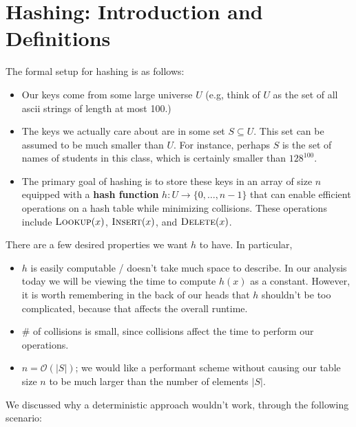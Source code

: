 \documentclass[14pt]{extreport}
\begin{document}
\section*{Hashing: Introduction and Definitions}
    The formal setup for hashing is as follows:
    \begin{itemize}[label={\textbf{--}}]
        \item Our keys come from some large universe $U$ (e.g, think of $U$ as the set of all ascii strings of length at most 100.) 
        \item The keys we actually care about are in some set $S \subseteq U$. This set can be assumed to be much smaller than $U$. For instance, perhaps $S$ is the set of names of students in this class, which is certainly smaller than $128^{100}$.
        \item The primary goal of hashing is to store these keys in an array of size $n$ equipped with a \textbf{hash function} $h \colon U \rightarrow \{0, \dots, n - 1 \}$ that can enable efficient operations on a hash table while minimizing collisions. These operations include $\textsc{Lookup}(x)$, $\textsc{Insert}(x)$, and $\textsc{Delete}(x)$.
    \end{itemize}
    There are a few desired properties we want $h$ to have. In particular,
        \begin{itemize}
            \item $h$ is easily computable / doesn't take much space to describe. In our analysis today we will be viewing the time to compute $h(x)$ as a constant. However, it is worth remembering in the back of our heads that $h$ shouldn't be too complicated, because that affects the overall runtime.
            \item \# of collisions is small, since collisions affect the time to perform our operations.
            \item $n = \mathcal{O}(|S|)$; we would like a performant scheme without causing our table size $n$ to be much larger than the number of elements $|S|$.
        \end{itemize}

    We discussed why a deterministic approach wouldn't work, through the following scenario:
    
\end{document}
